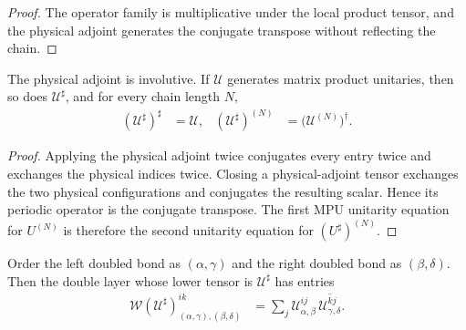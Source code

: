 \begin{proof}\leanok
    The operator family is multiplicative under the local product tensor, and
    the physical adjoint generates the conjugate transpose without reflecting
    the chain.
\end{proof}

\begin{lemma}
    \label{thm:mpu_physical_adjoint_identities}
    \leanok
    The physical adjoint is involutive. If $\mathcal U$ generates matrix
    product unitaries, then so does $\mathcal U^\sharp$, and for every chain
    length $N$,
    \begin{align}
        (\mathcal U^\sharp)^\sharp & =\mathcal U,
                                   & (\mathcal U^\sharp)^{(N)} & =\bigl(\mathcal U^{(N)}\bigr)^\dagger.
    \end{align}
\end{lemma}

\begin{proof}\leanok
    Applying the physical adjoint twice conjugates every entry twice and
    exchanges the physical indices twice. Closing a physical-adjoint tensor
    exchanges the two physical configurations and conjugates the resulting
    scalar. Hence its periodic operator is the conjugate transpose. The first
    MPU unitarity equation for $U^{(N)}$ is therefore the second unitarity
    equation for $(U^\sharp)^{(N)}$.
\end{proof}

\begin{lemma}
    \label{thm:mpu_output_first_double_layer_entry}
    \leanok
    Order the left doubled bond as $(\alpha,\gamma)$ and the right doubled
    bond as $(\beta,\delta)$. Then the double layer whose lower tensor is
    $\mathcal U^\sharp$ has entries
    \begin{align}
        \mathcal W(\mathcal U^\sharp)^{ik}_{(\alpha,\gamma),(\beta,\delta)}
         & =\sum_j
        \mathcal U^{ij}_{\alpha,\beta}\,
        \overline{\mathcal U^{kj}_{\gamma,\delta}}.
    \end{align}
\end{lemma}

